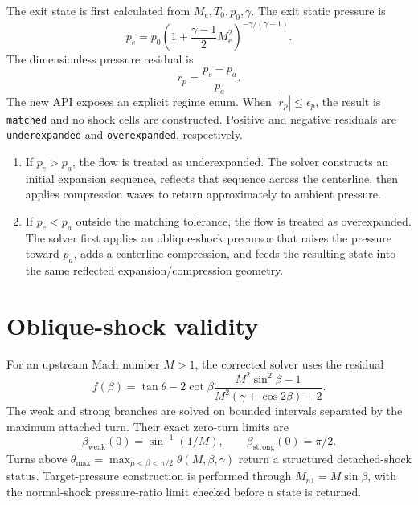 \documentclass[11pt]{article}
\newcommand{\gammaa}{\gamma}
\begin{document}
The exit state is first calculated from \(M_e,T_0,p_0,\gamma\).  The exit
static pressure is
\begin{equation}
  p_e = p_0
  \left(1+\frac{\gammaa-1}{2}M_e^2\right)^{-\gammaa/(\gammaa-1)}.
\end{equation}
The dimensionless pressure residual is
\begin{equation}
  r_p=\frac{p_e-p_a}{p_a}.
\end{equation}
The new API exposes an explicit regime enum.  When \(|r_p|\leq\epsilon_p\),
the result is \texttt{matched} and no shock cells are constructed.  Positive
and negative residuals are \texttt{underexpanded} and \texttt{overexpanded},
respectively.

\begin{enumerate}
  \item If \(p_e>p_a\), the flow is treated as underexpanded.  The solver
    constructs an initial expansion sequence, reflects that sequence across
    the centerline, then applies compression waves to return approximately to
    ambient pressure.
  \item If \(p_e<p_a\) outside the matching tolerance, the flow is treated as overexpanded.  The solver
    first applies an oblique-shock precursor that raises the pressure toward
    \(p_a\), adds a centerline compression, and feeds the resulting state into
    the same reflected expansion/compression geometry.
\end{enumerate}

\section{Oblique-shock validity}

For an upstream Mach number \(M>1\), the corrected solver uses the residual
\begin{equation}
 f(\beta)=\tan\theta-2\cot\beta\frac{M^2\sin^2\beta-1}
 {M^2(\gamma+\cos 2\beta)+2}.
\end{equation}
The weak and strong branches are solved on bounded intervals separated by the
maximum attached turn.  Their exact zero-turn limits are
\begin{equation}
 \beta_{\mathrm{weak}}(0)=\sin^{-1}(1/M),
 \qquad
 \beta_{\mathrm{strong}}(0)=\pi/2.
\end{equation}
Turns above
\(\theta_{\max}=\max_{\mu<\beta<\pi/2}\theta(M,\beta,\gamma)\)
return a structured detached-shock status.  Target-pressure construction is
performed through \(M_{n1}=M\sin\beta\), with the normal-shock pressure-ratio
limit checked before a state is returned.
\end{document}
